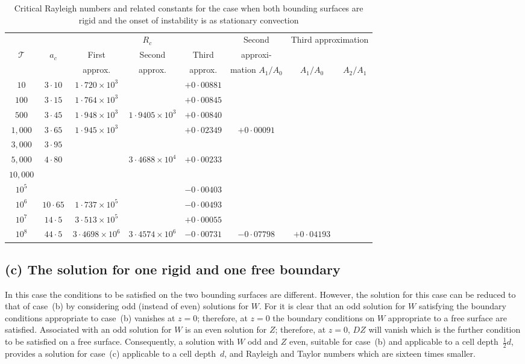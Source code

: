 \begin{table}[ht]
\centering
\caption{Critical Rayleigh numbers and related constants for the case when both bounding surfaces are rigid and the onset of instability is as stationary convection}
\label{tab:VIII}
\begin{tabular}{cccccccc}
\hline
& & \multicolumn{3}{c}{$R_c$} & \multicolumn{1}{c}{Second} & \multicolumn{2}{c}{Third approximation} \\
\cline{3-5}\cline{7-8}
$\mathscr{T}$ & $a_c$ & First & Second & Third & approxi- & & \\
& & approx. & approx. & approx. & mation $A_1/A_0$ & $A_1/A_0$ & $A_2/A_1$ \\
\hline
$10$ & $3{\cdot}10$ & $1{\cdot}720\times10^3$ & & $+0{\cdot}00881$ & & \\
$100$ & $3{\cdot}15$ & $1{\cdot}764\times10^3$ & & $+0{\cdot}00845$ & & \\
$500$ & $3{\cdot}45$ & $1{\cdot}948\times10^3$ & $1{\cdot}9405\times10^3$ & $+0{\cdot}00840$ & & \\
$1{,}000$ & $3{\cdot}65$ & $1{\cdot}945\times10^3$ & & $+0{\cdot}02349$ & $+0{\cdot}00091$ \\
$3{,}000$ & $3{\cdot}95$ & & & & \\
$5{,}000$ & $4{\cdot}80$ & & $3{\cdot}4688\times10^4$ & $+0{\cdot}00233$ & & \\
$10{,}000$ & & & & & & \\
$10^5$ & & & & $-0{\cdot}00403$ & & \\
$10^6$ & $10{\cdot}65$ & $1{\cdot}737\times10^5$ & & $-0{\cdot}00493$ & & \\
$10^7$ & $14{\cdot}5$ & $3{\cdot}513\times10^5$ & & $+0{\cdot}00055$ & & \\
$10^8$ & $44{\cdot}5$ & $3{\cdot}4698\times10^6$ & $3{\cdot}4574\times10^6$ & $-0{\cdot}00731$ & $-0{\cdot}07798$ & $+0{\cdot}04193$ \\
\hline
\end{tabular}
\end{table}

\subsection*{(c) The solution for one rigid and one free boundary}

In this case the conditions to be satisfied on the two bounding surfaces are different. However, the solution for this case can be reduced to that of case~(b) by considering odd (instead of even) solutions for $W$. For it is clear that an odd solution for $W$ satisfying the boundary conditions appropriate to case~(b) vanishes at $z = 0$; therefore, at $z = 0$ the boundary conditions on $W$ appropriate to a free surface are satisfied. Associated with an odd solution for $W$ is an even solution for $Z$; therefore, at $z = 0$, $DZ$ will vanish which is the further condition to be satisfied on a free surface. Consequently, a solution with $W$ odd and $Z$ even, suitable for case~(b) and applicable to a cell depth~$\frac{1}{2}d$, provides a solution for case~(c) applicable to a cell depth~$d$, and Rayleigh and Taylor numbers which are sixteen times smaller.

